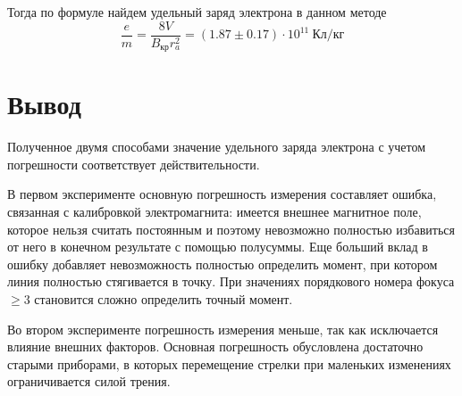 \documentclass[a4paper, 12pt]{article}
\begin{document}
Тогда по формуле найдем удельный заряд электрона в данном методе $$\dfrac{e}{m} = \dfrac{8V}{B_{\text{кр}}r_a^2} = (1.87 \pm 0.17) \cdot 10^{11} \: \text{Кл/кг}$$

\section{Вывод}

Полученное двумя способами значение удельного заряда электрона с учетом погрешности соответствует действительности. 

В первом эксперименте основную погрешность измерения составляет ошибка, связанная с калибровкой электромагнита: имеется внешнее магнитное поле, которое нельзя считать постоянным и поэтому невозможно полностью избавиться от него в конечном результате с помощью полусуммы. Еще больший вклад в ошибку добавляет невозможность полностью определить момент, при котором линия полностью стягивается в точку. При значениях порядкового номера фокуса $\geq 3$ становится сложно определить точный момент.

Во втором эксперименте погрешность измерения меньше, так как исключается влияние внешних факторов. Основная погрешность обусловлена достаточно старыми приборами, в которых перемещение стрелки при маленьких изменениях ограничивается силой трения.
\end{document}
